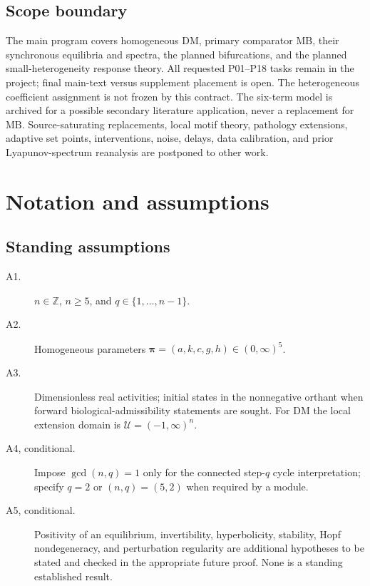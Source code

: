 \documentclass[11pt]{article}
\newcommand{\Z}{\mathbb{Z}}
\newcommand{\DM}{\mathrm{DM}}
\newcommand{\MB}{\mathrm{MB}}
\newcommand{\Domain}{\mathcal{U}}
\newcommand{\param}{\boldsymbol{\pi}}
\theoremstyle{definition}
\theoremstyle{remark}
\begin{document}
\subsection{Scope boundary}
The main program covers homogeneous $\DM$, primary comparator $\MB$, their
synchronous equilibria and spectra, the planned bifurcations, and the planned
small-heterogeneity response theory. All requested P01--P18 tasks remain in
the project; final main-text versus supplement placement is open.
The heterogeneous coefficient assignment is not frozen by this contract.
The six-term model is archived for a possible secondary literature application,
never a replacement for $\MB$. Source-saturating replacements, local motif
theory, pathology extensions, adaptive set points, interventions, noise,
delays, data calibration, and prior Lyapunov-spectrum reanalysis are postponed
to other work. 

\section{Notation and assumptions}
\label{sec:notation}
\subsection{Standing assumptions}
\begin{description}
\item[A1.] $n\in\Z$, $n\geq5$, and $q\in\{1,\ldots,n-1\}$.
\item[A2.] Homogeneous parameters $\param=(a,k,c,g,h)\in(0,\infty)^5$.
\item[A3.] Dimensionless real activities; initial states in the nonnegative
orthant when forward biological-admissibility statements are sought.
For $\DM$ the local extension domain is $\Domain=(-1,\infty)^n$.
\item[A4, conditional.] Impose $\gcd(n,q)=1$ only for the connected step-$q$
cycle interpretation; specify $q=2$ or $(n,q)=(5,2)$ when required by a module.
\item[A5, conditional.] Positivity of an equilibrium, invertibility,
hyperbolicity, stability, Hopf nondegeneracy, and perturbation regularity are
additional hypotheses to be stated and checked in the appropriate future proof.
None is a standing established result.
\end{description}
\end{document}
